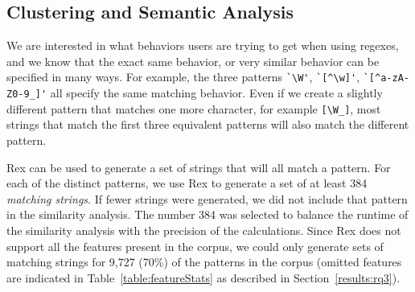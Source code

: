 
\subsection{Clustering and Semantic Analysis}
We are interested in what behaviors users are trying to get when using regexes, and we know that the exact same behavior, or very similar behavior can be specified in many ways.  For example, the three patterns \verb!`\W'!, \verb!`[^\w]'!, \verb!`[^a-zA-Z0-9_]'! all specify the same matching behavior.  Even if we create a slightly different pattern that matches one more character, for example \verb![\W_]!, most strings that match the first three equivalent patterns will also match the different pattern.


Rex can be used to generate a set of strings that will all match a pattern.  For each of the  distinct patterns, we use Rex to generate a set of at least 384 \emph{matching strings}. If fewer strings were generated, we did not include that pattern in the similarity analysis.
The number 384 was selected to balance the runtime of the similarity analysis with the precision of the calculations. Since Rex does not support all the features present in the corpus, we could only generate sets of matching strings for 9,727 (70\%) of the  patterns in the corpus (omitted features are indicated in Table~\ref{table:featureStats} as described in Section~\ref{results:rq3}).

